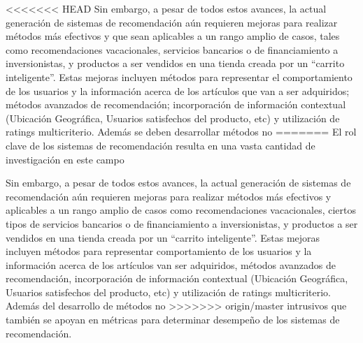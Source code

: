 <<<<<<< HEAD
Sin embargo, a pesar de todos estos avances, la actual generación de
sistemas de recomendación aún requieren mejoras para realizar métodos
más efectivos y que sean aplicables a un rango amplio de casos, tales como
recomendaciones vacacionales, servicios bancarios o de
financiamiento a inversionistas, y productos a ser vendidos en una
tienda creada por un ``carrito inteligente''. 
Estas mejoras
incluyen  métodos para representar el comportamiento  de los usuarios y la
información acerca de los artículos que van a ser adquiridos; métodos avanzados
de recomendación; incorporación de información contextual (Ubicación Geográfica, Usuarios satisfechos del producto, etc) y utilización
de ratings multicriterio. Además se deben desarrollar métodos no
=======
El rol clave de los sistemas de recomendación resulta en una vasta
cantidad de investigación en este campo

Sin embargo, a pesar de todos estos avances, la actual generación de
sistemas de recomendación aún requieren mejoras para realizar métodos
más efectivos y aplicables a un rango amplio de casos como
recomendaciones vacacionales, ciertos tipos de servicios bancarios o de
financiamiento a inversionistas, y productos a ser vendidos en una
tienda creada por un ``carrito inteligente''. 
Estas mejoras
incluyen  métodos para representar comportamiento  de los usuarios y la
información acerca de los artículos van ser adquiridos, métodos avanzados
de recomendación, incorporación de información contextual (Ubicación Geográfica, Usuarios satisfechos del producto, etc) y utilización
de ratings multicriterio. Además del desarrollo de métodos no
>>>>>>> origin/master
intrusivos que también se apoyan en métricas para determinar desempeño
de los sistemas de recomendación.
